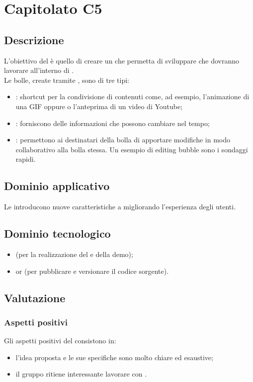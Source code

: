 \section {Capitolato C5}
	\subsection {Descrizione}
		L'obiettivo del  è quello di creare un  che permetta di sviluppare  che dovranno lavorare all'interno di . \\
		Le bolle, create tramite , sono di tre tipi:
		\begin{itemize}
			\item {}: shortcut per la condivisione di contenuti come, ad esempio, l'animazione di una GIF oppure o l'anteprima di un video di Youtube;
			\item {}: forniscono delle informazioni che possono cambiare nel tempo;
			\item {}: permettono ai destinatari della bolla di apportare modifiche in modo collaborativo alla bolla stessa. Un esempio di editing bubble sono i sondaggi rapidi.
		\end{itemize}
	\subsection {Dominio applicativo}
		Le  introducono nuove caratteristiche a  migliorando l'esperienza degli utenti.
	\subsection {Dominio tecnologico}
		\begin{itemize}
		\item \textbf{} (per la realizzazione del  e della demo);
		\item \textbf{} or \textbf{} (per pubblicare e versionare il codice sorgente).
		\end{itemize}
	\subsection {Valutazione}
		\subsubsection {Aspetti positivi}
		Gli aspetti positivi del  consistono in:
			\begin{itemize}
				\item l’idea proposta e le sue specifiche sono molto chiare ed esaustive;
				\item il gruppo ritiene interessante lavorare con  .
			\end{itemize}
